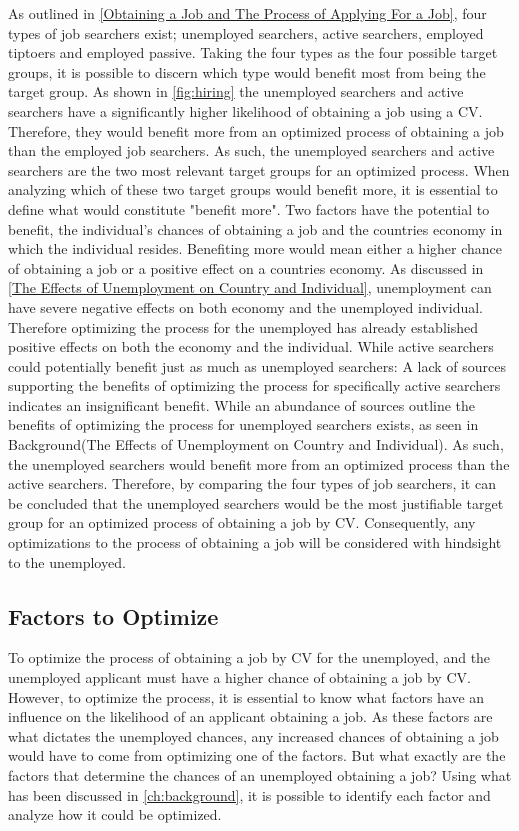 As outlined in \ref{Obtaining a Job and The Process of Applying For a Job}, four types of job searchers exist; unemployed searchers, active searchers, employed tiptoers and employed passive.
Taking the four types as the four possible target groups, it is possible to discern which type would benefit most from being the target group.
As shown in \ref{fig:hiring} the unemployed searchers and active searchers have a significantly higher likelihood of obtaining a job using a CV.
Therefore, they would benefit more from an optimized process of obtaining a job than the employed job searchers.
As such, the unemployed searchers and active searchers are the two most relevant target groups for an optimized process.
When analyzing which of these two target groups would benefit more, it is essential to define what would constitute "benefit more".
Two factors have the potential to benefit, the individual's chances of obtaining a job and the countries economy in which the individual resides.
Benefiting more would mean either a higher chance of obtaining a job or a positive effect on a countries economy.
As discussed in \ref{The Effects of Unemployment on Country and Individual}, unemployment can have severe negative effects on both economy and the unemployed individual.
Therefore optimizing the process for the unemployed has already established positive effects on both the economy and the individual.
While active searchers could potentially benefit just as much as unemployed searchers:
A lack of sources supporting the benefits of optimizing the process for specifically active searchers indicates an insignificant benefit.
While an abundance of sources outline the benefits of optimizing the process for unemployed searchers exists, as seen in Background(The Effects of Unemployment on Country and Individual).
As such, the unemployed searchers would benefit more from an optimized process than the active searchers.
Therefore, by comparing the four types of job searchers, it can be concluded that the unemployed searchers would be the most justifiable target group for an optimized process of obtaining a job by CV.
Consequently, any optimizations to the process of obtaining a job will be considered with hindsight to the unemployed. \\
 
\subsection{Factors to Optimize}
To optimize the process of obtaining a job by CV for the unemployed, and the unemployed applicant must have a higher chance of obtaining a job by CV.
However, to optimize the process, it is essential to know what factors have an influence on the likelihood of an applicant obtaining a job.
As these factors are what dictates the unemployed chances, any increased chances of obtaining a job would have to come from optimizing one of the factors.
But what exactly are the factors that determine the chances of an unemployed obtaining a job?
Using what has been discussed in \ref{ch:background}, it is possible to identify each factor and analyze how it could be optimized. \\

